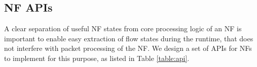 \subsection{NF APIs}
\label{sec:NFAPIs}

A clear separation of useful NF states from core processing logic of an NF is important to enable easy extraction of flow states during the runtime, that does not interfere with packet processing of the NF. We design a set of APIs for NFs to implement for this purpose, as listed in Table \ref{table:api}.

\begin{table}[!t]
\centering
\caption{APIs for NFs in \nfactor}
\label{table:api}
\end{table}


